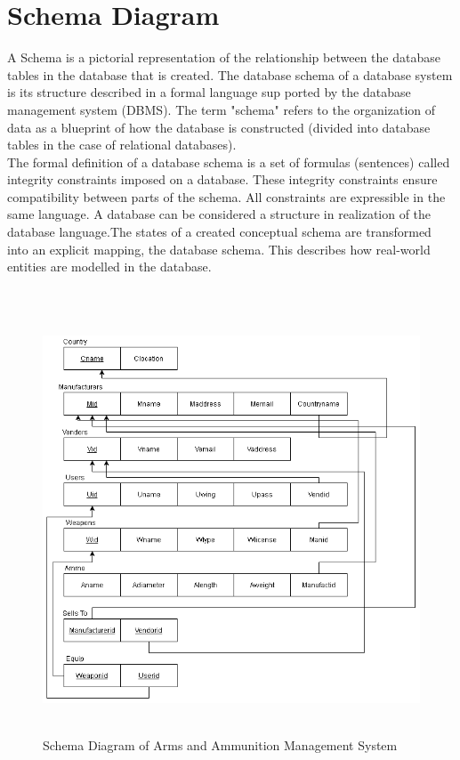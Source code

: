 \documentclass[12pt,a4paper]{report}
\begin{document}
\section{Schema Diagram}
\par
A Schema is a pictorial representation of the relationship between the database tables in the database that is created. The database schema of a database system is its structure described in a formal language sup ported by the database management system (DBMS). The term "schema" refers to the organization of data as a blueprint of how the database is constructed (divided into database tables in the case of relational databases). \\
The formal definition of a database schema is a set of formulas (sentences) called integrity constraints imposed on a database. These integrity constraints ensure compatibility between parts of the schema. All constraints are expressible in the same language. A database can be considered a structure in realization of the database language.The states of a created conceptual schema are transformed into an explicit mapping, the database schema. This describes how real-world entities are modelled in the database.
\\\\

\begin{figure}[hbtp]
\centering
\includegraphics[width=6in,height=5.0in]{../fig/RS}
\caption{Schema Diagram of Arms and Ammunition Management System}
\end{figure}
\end{document}
